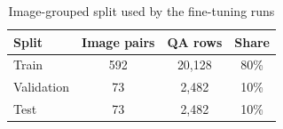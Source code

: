\begin{table}[htbp]
  \centering
  \caption{Image-grouped split used by the fine-tuning runs}
  \label{tab:split}
  \begin{tabular}{lccc}
    \toprule
    \textbf{Split} & \textbf{Image pairs} & \textbf{QA rows} & \textbf{Share} \\
    \midrule
    Train & 592 & 20,128 & 80\% \\
    Validation & 73 & 2,482 & 10\% \\
    Test & 73 & 2,482 & 10\% \\
    \bottomrule
  \end{tabular}
\end{table}
